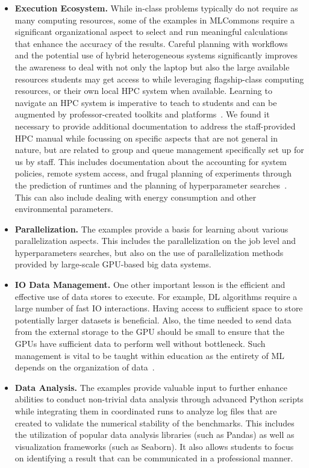 \begin{itemize}
\item {\bf Execution Ecosystem.} While in-class problems typically do not require as many computing resources, some of the examples in MLCommons require a significant organizational aspect to select and run meaningful calculations that enhance the accuracy of the results. Careful planning with workflows and the potential use of hybrid heterogeneous systems significantly improves the awareness to deal with not only the laptop but also the large available resources students may get access to while leveraging flagship-class computing resources, or their own local HPC system when available. Learning to navigate an HPC system is imperative to teach to students and can be augmented by professor-created toolkits and platforms~\cite{zou}. We found it necessary to provide additional documentation to address the staff-provided HPC manual while focussing on specific aspects that are not general in nature, but are related to group and queue management specifically set up for us by staff. This includes documentation about the accounting for system policies, remote system access, and frugal planning of experiments through the prediction of runtimes and the planning of hyperparameter searches~\cite{las-22-arxiv-workflow-cc,claesen}. This can also include dealing with energy consumption and other environmental parameters.

\item {\bf Parallelization.} The examples provide a basis for learning about various parallelization aspects. This includes the parallelization on the job level and hyperparameters searches, but also on the use of parallelization methods provided by large-scale GPU-based big data systems.

\item {\bf IO Data Management.} One other important lesson is the efficient and effective use of data stores to execute. For example, DL algorithms require a large number of fast IO interactions. Having access to sufficient space to store potentially larger datasets is beneficial. Also, the time needed to send data from the external storage to the GPU should be small to ensure that the GPUs have sufficient data to perform well without bottleneck. Such management is vital to be taught within education as the entirety of ML depends on the organization of data~\cite{shapiro}.

\item {\bf Data Analysis.} The examples provide valuable input to further enhance abilities to conduct non-trivial data analysis through advanced Python scripts while integrating them in coordinated runs to analyze log files that are created to validate the numerical stability of the benchmarks. This includes the utilization of popular data analysis libraries (such as Pandas) as well as visualization frameworks (such as Seaborn). It also allows students to focus on identifying a result that can be communicated in a professional manner.


\end{itemize}
